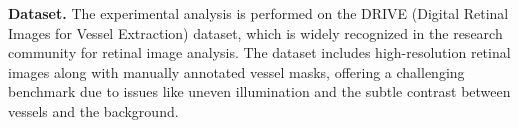 \documentclass[final]{article}
\begin{document}
\textbf{Dataset.} The experimental analysis is performed on the DRIVE (Digital Retinal Images for Vessel Extraction) dataset, which is widely recognized in the research community for retinal image analysis. The dataset includes high-resolution retinal images along with manually annotated vessel masks, offering a challenging benchmark due to issues like uneven illumination and the subtle contrast between vessels and the background.
\end{document}
